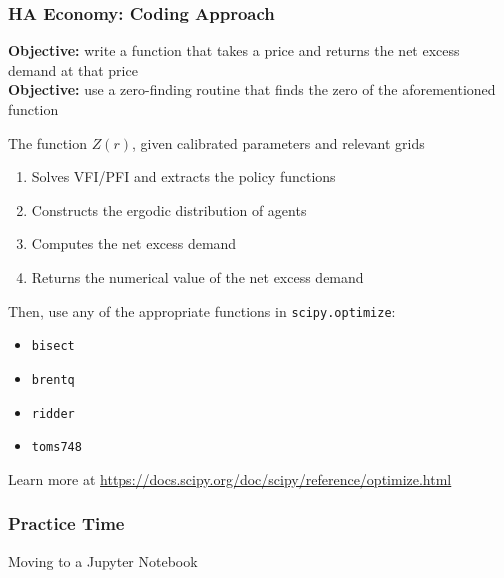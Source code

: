 \documentclass[10pt, aspectratio=1610, natbib, handout]{beamer}
\begin{document}
  \begin{frame}
    \frametitle{HA Economy: Coding Approach}

    \textbf{Objective:} write a function that takes a price and returns the net excess demand at that price \\
    \textbf{Objective:} use a zero-finding routine that finds the zero of the aforementioned function

    \vfill\pause

    The function $Z(r)$, given calibrated parameters and relevant grids
    \begin{enumerate}
      \item Solves VFI/PFI and extracts the policy functions
      \item \alert{Constructs the ergodic distribution of agents}
      \item Computes the net excess demand
      \item Returns the numerical value of the net excess demand
    \end{enumerate}

    \vfill\pause

    Then, use any of the appropriate functions in \texttt{scipy.optimize}:
    \begin{itemize}
      \item \texttt{bisect}
      \item \texttt{brentq}
      \item \texttt{ridder}
      \item \texttt{toms748}
    \end{itemize}

    \vfill

    Learn more at \url{https://docs.scipy.org/doc/scipy/reference/optimize.html}

  \end{frame}

  \begin{frame}
    \frametitle{Practice Time}

    Moving to a Jupyter Notebook

  \end{frame}
\end{document}
